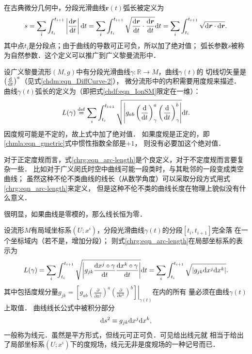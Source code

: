 在古典微分几何中，分段光滑曲线$\boldsymbol{r}(t)$弧长被定义为
\begin{equation*}
    s=\sum_{i} \int_{t_i}^{t_{i+1}} \left|\frac{{\rm d}\boldsymbol{r}}{{\rm d}t}\right| {\rm d} t
    =\sum_{i} \int_{t_i}^{t_{i+1}} \sqrt{\frac{{\rm d}\boldsymbol{r}}{{\rm d}t}\cdot
        \frac{{\rm d}\boldsymbol{r}}{{\rm d}t} } {\rm d} t
    =\sum_{i} \int_{t_i}^{t_{i+1}} \sqrt{{\rm d}\boldsymbol{r}\cdot{\rm d}\boldsymbol{r} }.
\end{equation*}
其中点${t_i}$是分段点；由于曲线的导数可正可负，所以加了绝对值；
弧长参数$s$被称为{\heiti 自然参数}．这个定义可以推广到广义黎曼流形中．


设广义黎曼流形$(M,g)$中有分段光滑曲线$\gamma:\mathbb{R}\to M$，曲线$\gamma(t)$的
切线切矢量是$\left(\frac{{\rm d}  }{{\rm d} t}\right)^a$（见式\eqref{chdm:eqn_DiffCurve-2}），
微分流形中的内积需要用度规来描述．
曲线$\gamma(t)${\heiti 弧长}的定义为（即把式\eqref{chdf:eqn_IonSM}限定在一维）：
\begin{equation}\label{chrg:eqn_arc-length}
    L(\gamma)\overset{\mathrm {def}}{=}\sum_{i} \int_{t_i}^{t_{i+1}} \sqrt{\left| g_{ab} \left(\frac{{\rm d}  }
        {{\rm d} t}\right)^a_{\gamma}\left(\frac{{\rm d}  }{{\rm d} t}\right)^b_{\gamma}\right|} {\rm d}t .
\end{equation}
因度规可能是不定的，故上式中加了绝对值．
如果度规是正定的，即\eqref{chmla:eqn_gmetric}式中惯性指数全部是$+1$，
则没有必要加这个绝对值．

对于正定度规而言，式\eqref{chrg:eqn_arc-length}是个良定义，对于不定度规而言要复杂一些．
比如对于广义闵氏时空中曲线可能一段类时，与其毗邻的一段变成类空曲线；
虽然这种不伦不类曲线的线长（从数学角度）可以采取分段方式用式\eqref{chrg:eqn_arc-length}来定义，
但是这种不伦不类的曲线长度在物理上貌似没有什么意义．

很明显，如果曲线是零模的，那么线长恒为零．

设流形$M$有局域坐标系$(U;x^i)$，分段光滑曲线$\gamma(t)$的分段$[t_i,t_{i+1}]$完全落
在一个坐标域内（若不是，增加分段）；
则式\eqref{chrg:eqn_arc-length}在局部坐标系的表示为
\begin{equation}\label{chrg:eqn_arc-length-local}
    L(\gamma)=\sum_{i} \int_{t_i}^{t_{i+1}} \sqrt{\left| g_{jk}
        \frac{{\rm d} x^j\circ\gamma }{{\rm d} t}\frac{{\rm d} x^k\circ\gamma }{{\rm d} t}
        \right|} {\rm d}t
    =\sum_{i} \int_{t_i}^{t_{i+1}} \sqrt{\left| g_{jk} {\rm d} x^j {\rm d} x^k  \right|}  .
\end{equation}  %
其中包括度规分量$g_{jk}= \left.\left[g_{ab}\left(\frac{\partial}{\partial x^j}\right)^a
\left(\frac{\partial}{\partial x^k}\right)^b \right] \right|_{\gamma(t)}$在内的所有
量必须在曲线$\gamma(t)$上取值．
曲线线长公式中被积分部分
\begin{equation}
    {\rm d}s^2 \equiv g_{jk} {\rm d} x^j {\rm d} x^k ,
\end{equation}
一般称为{\heiti 线元}．虽然是平方形式，但线元可正可负．可见给出线元就
相当于给出了局部坐标系$(U;x^i)$下的度规场，线元无非是度规场的一种记号而已．

